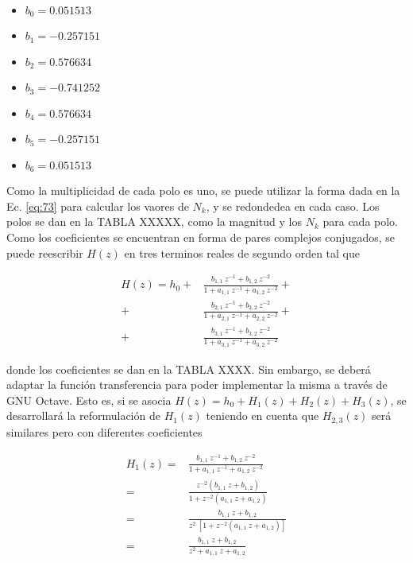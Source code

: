 \message{ !name(../main.tex)}\documentclass[journal,transmag]{IEEEtran}
\begin{document}
    \begin{itemize}
      \item $b_{0} = 0.051513$
      \item $b_{1} = -0.257151$
      \item $b_{2} = 0.576634$
      \item $b_{3} = -0.741252$
      \item $b_{4} = 0.576634$
      \item $b_{5} = -0.257151$
      \item $b_{6} = 0.051513$
    \end{itemize}

     Como la multiplicidad de cada polo es uno, se puede utilizar la forma dada
     en la Ec. \ref{eq:73} para calcular los vaores de $N_{k}$, y se redondedea
     en cada caso. Los polos se dan en la TABLA XXXXX, como la magnitud y los
     $N_{k}$ para cada polo. Como los coeficientes se encuentran en forma
     de pares complejos conjugados, se puede reescribir $H(z)$ en tres terminos
     reales de segundo orden tal que

     \begin{equation}
       \begin{aligned}
         H(z) = h_{0} +& \frac{b_{1,1} \: z^{-1} + b_{1,2} \: z^{-2}}{1 + a_{1,1} \: z^{-1} + a_{1,2} \: z^{-2}} +\\
         +& \frac{b_{2,1} \: z^{-1} + b_{2,2} \: z^{-2}}{1 + a_{2,1} \: z^{-1} + a_{2,2} \: z^{-2}} + \\
         +& \frac{b_{3,1} \: z^{-1} + b_{3,2} \: z^{-2}}{1 + a_{3,1} \: z^{-1} + a_{3,2} \: z^{-2}}
       \end{aligned}
     \end{equation}

     donde los coeficientes se dan en la TABLA XXXX. Sin embargo, se deberá
     adaptar la función transferencia para poder implementar la misma a través
     de GNU Octave. Esto es, si se asocia
     $H(z) = h_{0} + H_{1}(z) + H_{2}(z) + H_{3}(z)$, se desarrollará la
     reformulación de $H_{1}(z)$ teniendo en cuenta que $H_{2,3}(z)$ será
     similares pero con diferentes coeficientes

     \begin{equation}
       \begin{aligned}
         H_{1}(z) =& \frac{b_{1,1} \: z^{-1} + b_{1,2} \: z^{-2}}{1 + a_{1,1} \: z^{-1} + a_{1,2} \: z^{-2}} \\
         =& \frac{z^{-2} \left( b_{1,1} \: z + b_{1,2} \right)}{1 + z^{-2} \left( a_{1,1} \: z + a_{1,2} \right)} \\
         =& \frac{b_{1,1} \: z + b_{1,2}}{z^{2} \: \left[1 + z^{-2} \left( a_{1,1} \: z + a_{1,2} \right) \right]} \\
         =& \frac{b_{1,1} \: z + b_{1,2}}{z^{2} + a_{1,1} \: z + a_{1,2}}
       \end{aligned}
     \end{equation}
\end{document}

